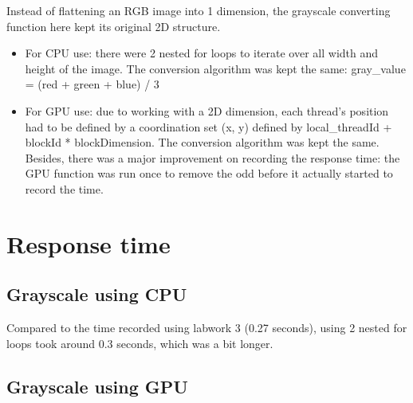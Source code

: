 \documentclass{article}
\begin{document}
Instead of flattening an RGB image into 1 dimension, the grayscale converting function here kept its original 2D structure.

\begin{itemize}
  \item For CPU use: there were 2 nested for loops to iterate over all width and height of the image. The conversion algorithm was kept the same: gray\_value = (red + green + blue) / 3
  \item For GPU use: due to working with a 2D dimension, each thread's position had to be defined by a coordination set (x, y) defined by local\_threadId + blockId * blockDimension. The conversion algorithm was kept the same. Besides, there was a major improvement on recording the response time: the GPU function was run once to remove the odd before it actually started to record the time.
\end{itemize}

\section{Response time}
\subsection{Grayscale using CPU}
Compared to the time recorded using labwork 3 (0.27 seconds), using 2 nested for loops took around 0.3 seconds, which was a bit longer.

\subsection{Grayscale using GPU}
\end{document}
